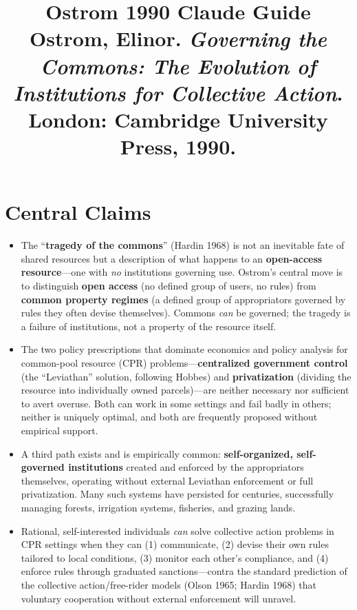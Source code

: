 \documentclass[12pt]{article}
\title{\textbf{Ostrom 1990 Claude Guide}\\
\large Ostrom, Elinor. \textit{Governing the Commons: The Evolution of Institutions for Collective Action}.\\
London: Cambridge University Press, 1990.}
\author{}
\date{}
\begin{document}
\maketitle
\tableofcontents
\newpage

\section{Central Claims}

\begin{itemize}[leftmargin=*, itemsep=4pt]
    \item The ``\textbf{tragedy of the commons}'' (Hardin 1968) is not an inevitable fate of shared resources but a description of what happens to an \textbf{open-access resource}---one with \emph{no} institutions governing use. Ostrom's central move is to distinguish \textbf{open access} (no defined group of users, no rules) from \textbf{common property regimes} (a defined group of appropriators governed by rules they often devise themselves). Commons \emph{can} be governed; the tragedy is a failure of institutions, not a property of the resource itself.
    \item The two policy prescriptions that dominate economics and policy analysis for common-pool resource (CPR) problems---\textbf{centralized government control} (the ``Leviathan'' solution, following Hobbes) and \textbf{privatization} (dividing the resource into individually owned parcels)---are neither necessary nor sufficient to avert overuse. Both can work in some settings and fail badly in others; neither is uniquely optimal, and both are frequently proposed without empirical support.
    \item A third path exists and is empirically common: \textbf{self-organized, self-governed institutions} created and enforced by the appropriators themselves, operating without external Leviathan enforcement or full privatization. Many such systems have persisted for centuries, successfully managing forests, irrigation systems, fisheries, and grazing lands.
    \item Rational, self-interested individuals \emph{can} solve collective action problems in CPR settings when they can (1) communicate, (2) devise their own rules tailored to local conditions, (3) monitor each other's compliance, and (4) enforce rules through graduated sanctions---contra the standard prediction of the collective action/free-rider models (Olson 1965; Hardin 1968) that voluntary cooperation without external enforcement will unravel.

\end{itemize}
\end{document}
